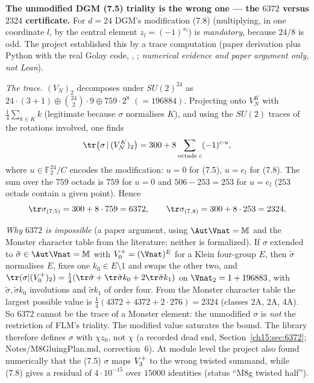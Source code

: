 \begin{warning}
\textbf{The unmodified DGM (7.5) triality is the wrong one --- the $6372$ versus $2324$ certificate.}
For $d=24$ DGM's modification (7.8) (multiplying, in one coordinate $l$, by the central element
$z_l=(-1)^{x_l}$) is \emph{mandatory}, because $24/8$ is odd.  The project established this by a
trace computation (paper derivation plus Python with the real Golay code,
, ; \emph{numerical evidence and paper
argument only, not Lean}).

\emph{The trace.}  $(V_N)_2$ decomposes under $SU(2)^{24}$ as $24\cdot(3+1)\oplus\binom{24}2\cdot9
\oplus759\cdot2^8$ $(=196884)$.  Projecting onto $V_N^K$ with $\tfrac14\sum_{k\in K}k$ (legitimate
because $\sigma$ normalises $K$), and using the $SU(2)$ traces of the rotations involved, one finds
\begin{equation*}
  \tr\big(\sigma\,|\,(V_N^K)_2\big)=300+8\sum_{\text{octads }c}(-1)^{c\cdot u},
\end{equation*}
where $u\in\mathbb F_2^{24}/C$ encodes the modification: $u=0$ for (7.5), $u=e_l$ for (7.8).  The
sum over the $759$ octads is $759$ for $u=0$ and $506-253=253$ for $u=e_l$ ($253$ octads contain a
given point).  Hence
\begin{equation*}
  \tr\sigma_{(7.5)}=300+8\cdot759=6372,\qquad \tr\sigma_{(7.8)}=300+8\cdot253=2324 .
\end{equation*}

\emph{Why $6372$ is impossible} (a paper argument, using $\Aut\Vnat=\mathbb M$ and the Monster
character table from the literature; neither is formalized).  If $\sigma$ extended to $\tilde\sigma\in\Aut\Vnat=\mathbb M$ with
$\chelVz=(\Vnat)^E$ for a Klein four-group $E$, then $\tilde\sigma$ normalises $E$, fixes one
$k_0\in E\setminus1$ and swaps the other two, and
$\tr(\sigma|(\chelVz)_2)=\tfrac14(\tr\tilde\sigma+\tr\tilde\sigma k_0+2\tr\tilde\sigma k_1)$ on
$\Vnat_2=1+196883$, with $\tilde\sigma,\tilde\sigma k_0$ involutions and $\tilde\sigma k_1$ of order
four.  From the Monster character table the largest possible value is
$\tfrac14(4372+4372+2\cdot276)=2324$ (classes 2A, 2A, 4A).  So $6372$ cannot be the trace of a Monster
element: the unmodified $\sigma$ is \emph{not} the restriction of FLM's triality.  The modified value
saturates the bound.  The library therefore defines $\sigma$ with $\chi z_0$, not $\chi$
(a recorded dead end, Section~\ref{ch15:sec:6372}; Notes/M8GluingPlan.md, correction~6).  At module level the
project also found numerically that the (7.5) $\sigma$ maps $V_3^{+}$ to the wrong twisted summand,
while (7.8) gives a residual of $4\cdot10^{-15}$ over $15000$ identities (status ``M8g twisted half'').
\end{warning}

